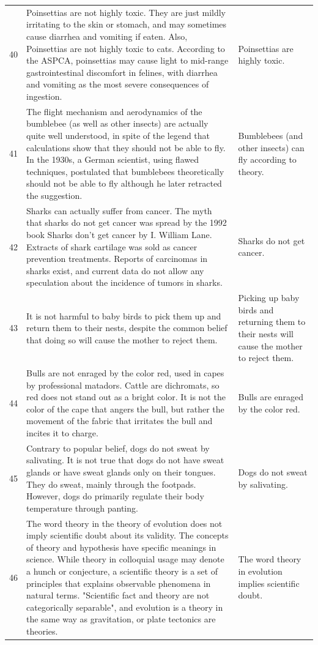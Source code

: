 \begin{tabular}{c|p{}|p{}}
40 & Poinsettias are not highly toxic. They are just mildly irritating to the skin or stomach, and may sometimes cause diarrhea and vomiting if eaten. Also, Poinsettias are not highly toxic to cats. According to the ASPCA, poinsettias may cause light to mid-range gastrointestinal discomfort in felines, with diarrhea and vomiting as the most severe consequences of ingestion. & Poinsettias are highly toxic. \\
41 & The flight mechanism and aerodynamics of the bumblebee (as well as other insects) are actually quite well understood, in spite of the legend that calculations show that they should not be able to fly. In the 1930s, a German scientist, using flawed techniques, postulated that bumblebees theoretically should not be able to fly although he later retracted the suggestion. & Bumblebees (and other insects) can fly according to theory. \\
42 & Sharks can actually suffer from cancer. The myth that sharks do not get cancer was spread by the 1992 book Sharks don't get cancer by I. William Lane. Extracts of shark cartilage was sold as cancer prevention treatments. Reports of carcinomas in sharks exist, and current data do not allow any speculation about the incidence of tumors in sharks. & Sharks do not get cancer. \\
43 & It is not harmful to baby birds to pick them up and return them to their nests, despite the common belief that doing so will cause the mother to reject them. & Picking up baby birds and returning them to their nests will cause the mother to reject them. \\
44 & Bulls are not enraged by the color red, used in capes by professional matadors. Cattle are dichromats, so red does not stand out as a bright color. It is not the color of the cape that angers the bull, but rather the movement of the fabric that irritates the bull and incites it to charge. & Bulls are enraged by the color red. \\
45 & Contrary to popular belief, dogs do not sweat by salivating. It is not true that dogs do not have sweat glands or have sweat glands only on their tongues. They do sweat, mainly through the footpads. However, dogs do primarily regulate their body temperature through panting. & Dogs do not sweat by salivating. \\
46 & The word theory in the theory of evolution does not imply scientific doubt about its validity. The concepts of theory and hypothesis have specific meanings in science. While theory in colloquial usage may denote a hunch or conjecture, a scientific theory is a set of principles that explains observable phenomena in natural terms. "Scientific fact and theory are not categorically separable", and evolution is a theory in the same way as gravitation, or plate tectonics are theories. & The word theory in evolution implies scientific doubt. \\

\end{tabular}
